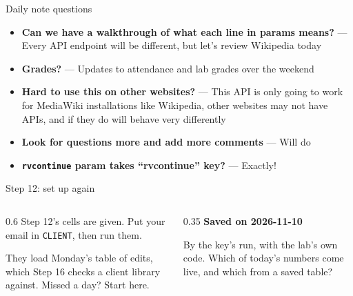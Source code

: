 \documentclass[9pt,aspectratio=169]{beamer}
\begin{document}
\begin{frame}{Daily note questions}\small
    \begin{itemize}
        \item \textbf{Can we have a walkthrough of what each line in params means?} --- Every API endpoint will be different, but let's review Wikipedia today
        \item \textbf{Grades?} --- Updates to attendance and lab grades over the weekend
        \item \textbf{Hard to use this on other websites?} --- This API is only going to work for MediaWiki installations like Wikipedia, other websites may not have APIs, and if they do will behave very differently
        \item \textbf{Look for questions more and add more comments} --- Will do
        \item \textbf{\texttt{rvcontinue} param takes ``rvcontinue'' key?} --- Exactly!
    \end{itemize}
    
\end{frame}

\begin{frame}{Step 12: set up again}
    \begin{columns}[T]
        \begin{column}{0.6\textwidth}
            Step 12's cells are given. Put your email in \texttt{CLIENT}, then run them.

            \medskip
            They load Monday's table of edits, which Step 16 checks a client library against. Missed a day? Start here.
        \end{column}
        \begin{column}{0.35\textwidth}
            \textbf{Saved on 2026-11-10}\\[2pt]
            {\footnotesize By the key's run, with the lab's own code. Which of today's numbers come live, and which from a saved table?\par}
        \end{column}
    \end{columns}
\end{frame}
\end{document}
